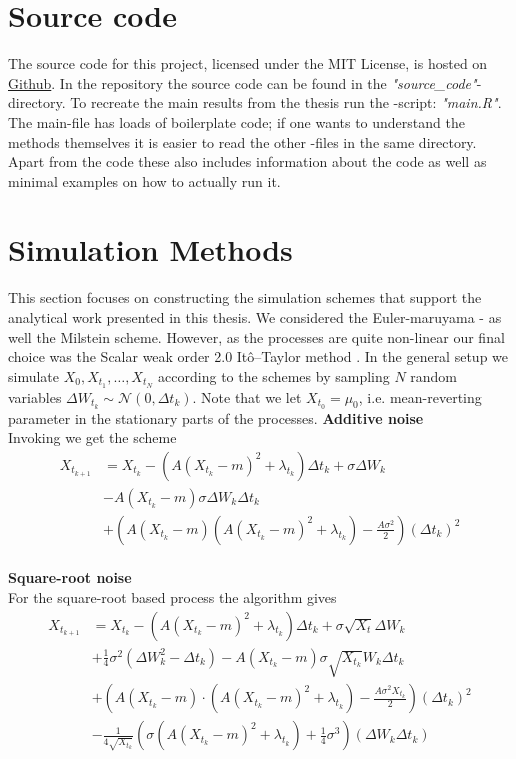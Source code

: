 \section{Source code}
The source code for this project, licensed under the MIT License, is hosted on \href{https://github.com/Gantzhorn/Thesis}{Github}. In the repository the source code can be found in the \textit{"source\_code"}-directory. To recreate the main results from the thesis run the -script: \textit{"main.R"}. The main-file has loads of boilerplate code; if one wants to understand the methods themselves it is easier to read the other -files in the same directory. Apart from the code these also includes information about the code as well as minimal examples on how to actually run it. 
\section{Simulation Methods}\label{appendix:simMethods}
This section focuses on constructing the simulation schemes that support the analytical work presented in this thesis. We considered the Euler-maruyama - as well the Milstein scheme. However, as the processes are quite non-linear our final choice was the Scalar weak order 2.0 Itô–Taylor method \cite[algorithm 8.5]{Srkk2019}. In the general setup we simulate $X_0,X_{t_1},\dots, X_{t_N}$ according to the schemes by sampling $N$ random variables $\Delta W_{t_k}\sim\mathcal{N}\left(0, \Delta t_k\right)$. Note that we let $X_{t_0} = \mu_0$, i.e. mean-reverting parameter in the stationary parts of the processes.
\noindent \textbf{Additive noise}\\
Invoking \cite[algorithm 8.5]{Srkk2019} we get the scheme
\begin{align}
    X_{t_{k + 1}} &= X_{t_k} - \left(A(X_{t_k} - m)^2 + \lambda_{t_k}\right) \Delta t_k + \sigma \Delta W_{k} \nonumber \\&-  A \left(X_{t_k} - m\right)\sigma \Delta W_k \Delta t_k\nonumber \\
    & + \left(A\left(X_{t_k} - m\right)\left(A\left(X_{t_k} - m\right)^2 + \lambda_{t_k}\right) - \frac{A \sigma^2}{2}\right)\left(\Delta t_k\right)^2 \label{eq:OUSim}
\end{align}
\\
\textbf{Square-root noise}\\
For the square-root based process the algorithm gives 
\begin{align}
    X_{t_{k + 1}} &= X_{t_k} - \left(A(X_{t_k} - m)^2 + \lambda_{t_k}\right) \Delta t_k + \sigma \sqrt{X_t} \Delta W_{k}\nonumber\\ &+ \frac{1}{4}\sigma^2 \left(\Delta W_k^2 - \Delta t_k\right)     - A\left(X_{t_k} - m\right)\sigma \sqrt{X_{t_k}} W_k \Delta t_k
    \nonumber\\
     &+ \left(A\left(X_{t_k} - m\right)\cdot \left(A\left(X_{t_k} - m\right)^2 + \lambda_{t_k}\right) - \frac{A\sigma^2 X_{t_k}}{2}\right)(\Delta t_k)^2 \nonumber\\
    &- \frac{1}{4\sqrt{X_{t_k}}}\left(\sigma\left(A\left(X_{t_k} - m\right)^2 + \lambda_{t_k}\right) + \frac{1}{4}\sigma^3\right) \left(\Delta W_k \Delta t_k\right)
\end{align}
